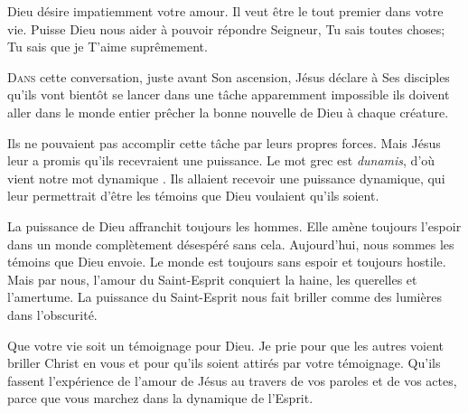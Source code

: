 Dieu désire impatiemment votre amour. Il veut être le tout premier
 dans votre vie. Puisse Dieu nous aider à pouvoir répondre\frcolon{} 
 \Og Seigneur, Tu sais toutes choses; Tu sais que je T'aime suprêmement. \Fg{}

\dvrule






\lettrine{D}{ans} cette conversation, juste avant Son ascension,
 Jésus déclare à Ses disciples qu'ils vont bientôt se lancer
 dans une tâche apparemment impossible\frcolon{}
 ils doivent aller dans le monde entier prêcher la bonne nouvelle
 de Dieu à chaque créature.

Ils ne pouvaient pas accomplir cette tâche par leurs propres forces.
 Mais Jésus leur a promis qu'ils recevraient une puissance.
 Le mot grec est \emph{dunamis}, d'où vient notre mot \Og dynamique \Fg{}.
 Ils allaient recevoir une puissance dynamique, qui leur permettrait
 d'être les témoins que Dieu voulaient qu'ils soient.


La puissance de Dieu affranchit toujours les hommes.
 Elle amène toujours l'espoir dans un monde complètement désespéré
 sans cela. Aujourd'hui, nous sommes les témoins que Dieu envoie.
 Le monde est toujours sans espoir et toujours hostile. Mais par nous,
 l'amour du Saint-Esprit conquiert la haine, les querelles et l'amertume.
 La puissance du Saint-Esprit nous fait briller
 comme des lumières dans l'obscurité.

Que votre vie soit un témoignage pour Dieu.
 Je prie pour que les autres voient briller Christ en vous
 et pour qu'ils soient attirés par votre témoignage.
 Qu'ils fassent l'expérience de l'amour de Jésus au travers de vos paroles
 et de vos actes, parce que vous marchez dans la dynamique de l'Esprit.

\dvrule

